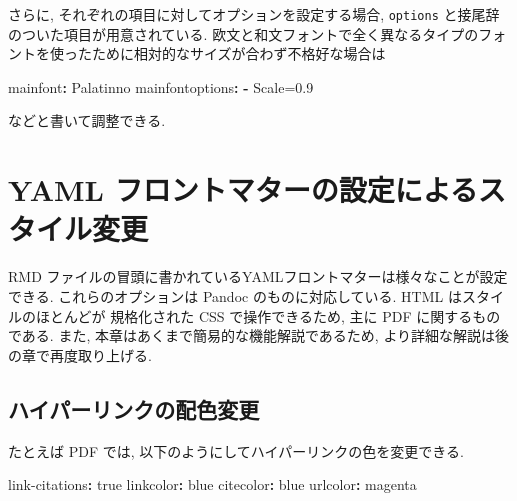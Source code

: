 \documentclass[
]{bxjsbook}
\newenvironment{Shaded}{\begin{snugshade}}{\end{snugshade}}
\newcommand{\AttributeTok}[1]{\textcolor[rgb]{0.77,0.63,0.00}{#1}}
\newcommand{\CharTok}[1]{\textcolor[rgb]{0.31,0.60,0.02}{#1}}
\newcommand{\FunctionTok}[1]{\textcolor[rgb]{0.00,0.00,0.00}{#1}}
\newcommand{\KeywordTok}[1]{\textcolor[rgb]{0.13,0.29,0.53}{\textbf{#1}}}
\theoremstyle{definition}
\theoremstyle{definition}
\theoremstyle{definition}
\theoremstyle{remark}
\begin{document}
さらに, それぞれの項目に対してオプションを設定する場合, \texttt{options}
と接尾辞のついた項目が用意されている.
欧文と和文フォントで全く異なるタイプのフォントを使ったために相対的なサイズが合わず不格好な場合は

\begin{Shaded}
\begin{Highlighting}[]
\FunctionTok{mainfont}\KeywordTok{:}\AttributeTok{ Palatinno}
\FunctionTok{mainfontoptions}\KeywordTok{:}
\AttributeTok{  }\KeywordTok{{-}}\AttributeTok{ Scale=0.9}
\end{Highlighting}
\end{Shaded}

などと書いて調整できる.

\hypertarget{yaml-ux30d5ux30edux30f3ux30c8ux30deux30bfux30fcux306eux8a2dux5b9aux306bux3088ux308bux30b9ux30bfux30a4ux30ebux5909ux66f4}{%
\section{YAML
フロントマターの設定によるスタイル変更}\label{yaml-ux30d5ux30edux30f3ux30c8ux30deux30bfux30fcux306eux8a2dux5b9aux306bux3088ux308bux30b9ux30bfux30a4ux30ebux5909ux66f4}}

RMD
ファイルの冒頭に書かれているYAMLフロントマターは様々なことが設定できる.
これらのオプションは Pandoc のものに対応している. HTML
はスタイルのほとんどが 規格化された CSS で操作できるため, 主に PDF
に関するものである. また, 本章はあくまで簡易的な機能解説であるため,
より詳細な解説は後の章で再度取り上げる.

\hypertarget{ux30cfux30a4ux30d1ux30fcux30eaux30f3ux30afux306eux914dux8272ux5909ux66f4}{%
\subsection{ハイパーリンクの配色変更}\label{ux30cfux30a4ux30d1ux30fcux30eaux30f3ux30afux306eux914dux8272ux5909ux66f4}}

たとえば PDF では, 以下のようにしてハイパーリンクの色を変更できる.

\begin{Shaded}
\begin{Highlighting}[]
\FunctionTok{link{-}citations}\KeywordTok{:}\AttributeTok{ }\CharTok{true}
\FunctionTok{linkcolor}\KeywordTok{:}\AttributeTok{ blue}
\FunctionTok{citecolor}\KeywordTok{:}\AttributeTok{ blue}
\FunctionTok{urlcolor}\KeywordTok{:}\AttributeTok{ magenta}
\end{Highlighting}
\end{Shaded}
\end{document}
